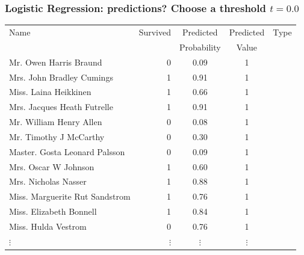 \documentclass[aspectratio=169]{beamer}
\theoremstyle{principle}
\begin{document}
\begin{frame}
\frametitle{Logistic Regression: predictions?  Choose a threshold $t = 0.0$}

\begin{table}[ht]
\centering
\begin{tabular}{l | r | c | c | c}

 Name & Survived & Predicted & Predicted & Type\\ 
&&Probability&Value\\
  \hline
  \hline
 Mr. Owen Harris Braund &   0 & 0.09 & 1 &\\ 
 Mrs. John Bradley Cumings &   1 & 0.91 & 1&\\ 
 Miss. Laina Heikkinen &   1 & 0.66 & 1&\\ 
 Mrs. Jacques Heath Futrelle &   1 & 0.91 & 1&\\ 
 Mr. William Henry Allen &   0 & 0.08 & 1&\\ 
 Mr. Timothy J McCarthy &   0 & 0.30 & 1&\\ 
 Master. Gosta Leonard Palsson &   0 & 0.09 & 1&\\ 
 Mrs. Oscar W Johnson &   1 & 0.60 & 1&\\ 
 Mrs. Nicholas Nasser &   1 & 0.88 & 1&\\ 
 Miss. Marguerite Rut Sandstrom &   1 & 0.76 & 1&\\ 
 Miss. Elizabeth Bonnell &   1 & 0.84 &1 &\\ 
 Miss. Hulda Vestrom &   0 & 0.76 &1&\\ 
$\vdots$ & $\vdots$ & $\vdots$ & $\vdots$ & 
\end{tabular}
\end{table}

\end{frame}
\end{document}
